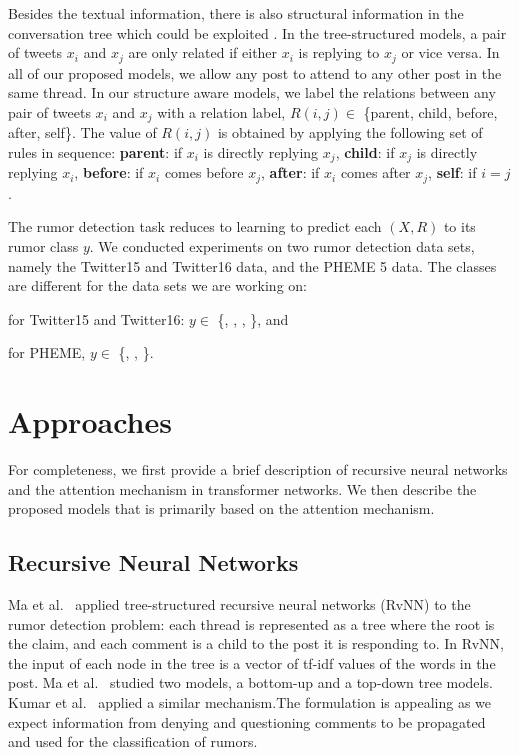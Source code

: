 \documentclass[letterpaper]{article} %
\begin{document}
Besides the textual information, there is also structural information in the conversation tree which could be exploited \cite{ma18,wu15a}. In the tree-structured models, a pair of tweets $x_{i}$ and $x_{j}$ are only related if either $x_{i}$ is replying to $x_{j}$ or vice versa. In all of our proposed models, we allow any post to attend to any other post in the same thread. In our structure aware models, we label the relations between any pair of tweets $x_{i}$ and $x_{j}$ with a relation label, $R(i,j) \in$ \{parent, child, before, after, self\}. The value of $R(i,j)$ is obtained by applying the following set of rules in sequence: 
\textbf{parent}: if $x_{i}$ is directly replying $x_{j}$, \textbf{child}: if $x_{j}$ is directly replying $x_{i}$, \textbf{before}: if $x_{i}$ comes before $x_{j}$, \textbf{after}: if $x_{i}$ comes after $x_{j}$, \textbf{self}: if $i=j$.

The rumor detection task reduces to learning to predict each $(X,R)$ to its rumor class $y$. We conducted experiments on two rumor detection data sets, namely the Twitter15 and Twitter16 data, and the PHEME 5 data. The classes are different for the data sets we are working on:
\begin{itemize*}
\item for Twitter15 and Twitter16: $y\in$ \{\nonrumor{}, \falserumor{}, \truerumor{},  \unverified{}\}, and 
\item for PHEME, $y \in $ \{\falserumor{}, \truerumor{},  \unverified{}\}. 
\end{itemize*}

\section{Approaches} \label{rumor_detection_transformer}

For completeness, we first provide a brief description of recursive neural networks and the attention mechanism in transformer networks. We then describe the proposed models that is primarily based on the attention mechanism. 

\subsection{Recursive Neural Networks}
\label{rvnn}

Ma et al.~ applied tree-structured recursive neural networks (RvNN) to the rumor detection problem: each thread is represented as a tree where the root is the claim, and each comment is a child to the post it is responding to.
In RvNN,  the input  of  each  node  in  the  tree is a vector of tf-idf values of the words in the post. Ma et al.~ studied two models, a bottom-up and a top-down tree models. Kumar et al.~ applied a similar mechanism.The formulation is appealing as we expect information from denying and questioning comments to be propagated and used for the classification of rumors. 
\end{document}
